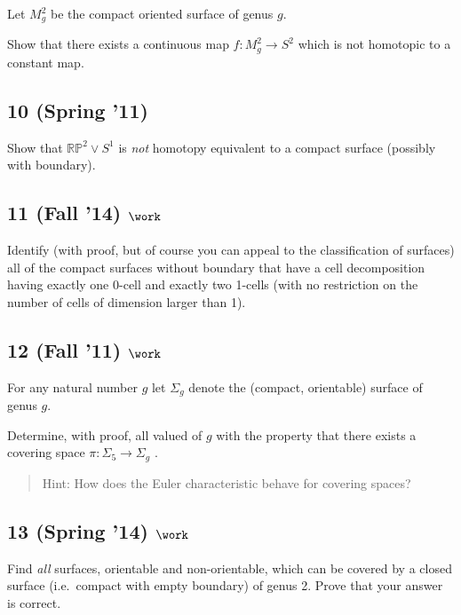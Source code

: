 Let \(M_g^2\) be the compact oriented surface of genus \(g\).

Show that there exists a continuous map \(f : M_g^2 \to S^2\) which is
not homotopic to a constant map.

\hypertarget{spring-11}{%
\subsection{10 (Spring '11)}\label{spring-11}}

Show that \({\mathbb{RP}}^2 \lor S^1\) is \emph{not} homotopy equivalent
to a compact surface (possibly with boundary).

\hypertarget{fall-14-work-4}{%
\subsection{\texorpdfstring{11 (Fall '14)
\(\work\)}{11 (Fall '14) \textbackslash work}}\label{fall-14-work-4}}

Identify (with proof, but of course you can appeal to the classification
of surfaces) all of the compact surfaces without boundary that have a
cell decomposition having exactly one 0-cell and exactly two 1-cells
(with no restriction on the number of cells of dimension larger than 1).

\hypertarget{fall-11-work-2}{%
\subsection{\texorpdfstring{12 (Fall '11)
\(\work\)}{12 (Fall '11) \textbackslash work}}\label{fall-11-work-2}}

For any natural number \(g\) let \(\Sigma_g\) denote the (compact,
orientable) surface of genus \(g\).

Determine, with proof, all valued of \(g\) with the property that there
exists a covering space \(\pi : \Sigma_5 \to \Sigma_g\) .

\begin{quote}
Hint: How does the Euler characteristic behave for covering spaces?
\end{quote}

\hypertarget{spring-14-work-2}{%
\subsection{\texorpdfstring{13 (Spring '14)
\(\work\)}{13 (Spring '14) \textbackslash work}}\label{spring-14-work-2}}

Find \emph{all} surfaces, orientable and non-orientable, which can be
covered by a closed surface (i.e.~compact with empty boundary) of genus
2. Prove that your answer is correct.

